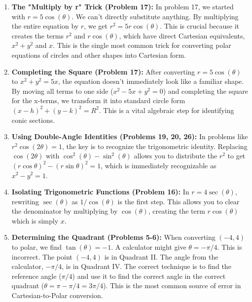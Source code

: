 \documentclass{article}
\begin{document}
\begin{enumerate}
    \item \textbf{The "Multiply by r" Trick (Problem 17):}
    In problem 17, we started with \(r = 5\cos(\theta)\). We can't directly substitute anything. By multiplying the entire equation by \(r\), we get \(r^2 = 5r\cos(\theta)\). This is crucial because it creates the terms \(r^2\) and \(r\cos(\theta)\), which have direct Cartesian equivalents, \(x^2+y^2\) and \(x\). This is the single most common trick for converting polar equations of circles and other shapes into Cartesian form.

    \item \textbf{Completing the Square (Problem 17):}
    After converting \(r=5\cos(\theta)\) to \(x^2+y^2=5x\), the equation doesn't immediately look like a familiar shape. By moving all terms to one side (\(x^2-5x+y^2=0\)) and completing the square for the x-terms, we transform it into standard circle form \((x-h)^2+(y-k)^2=R^2\). This is a vital algebraic step for identifying conic sections.

    \item \textbf{Using Double-Angle Identities (Problems 19, 20, 26):}
    In problems like \(r^2\cos(2\theta)=1\), the key is to recognize the trigonometric identity. Replacing \(\cos(2\theta)\) with \(\cos^2(\theta)-\sin^2(\theta)\) allows you to distribute the \(r^2\) to get \((r\cos\theta)^2 - (r\sin\theta)^2 = 1\), which is immediately recognizable as \(x^2-y^2=1\).

    \item \textbf{Isolating Trigonometric Functions (Problem 16):}
    In \(r = 4\sec(\theta)\), rewriting \(\sec(\theta)\) as \(1/\cos(\theta)\) is the first step. This allows you to clear the denominator by multiplying by \(\cos(\theta)\), creating the term \(r\cos(\theta)\) which is simply \(x\).

    \item \textbf{Determining the Quadrant (Problems 5-6):}
    When converting \((-4, 4)\) to polar, we find \(\tan(\theta)=-1\). A calculator might give \(\theta = -\pi/4\). This is incorrect. The point \((-4,4)\) is in Quadrant II. The angle from the calculator, \(-\pi/4\), is in Quadrant IV. The correct technique is to find the reference angle (\(\pi/4\)) and use it to find the correct angle in the correct quadrant (\(\theta = \pi - \pi/4 = 3\pi/4\)). This is the most common source of error in Cartesian-to-Polar conversion.
\end{enumerate}
\end{document}
